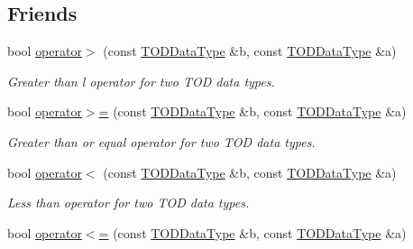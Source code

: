 \subsection*{Friends}
\begin{DoxyCompactItemize}
\item 
bool \hyperlink{structpc__emulator_1_1TODDataType_a1b6cce613b3eb660fa7df505d1dcbaa9}{operator$>$} (const \hyperlink{structpc__emulator_1_1TODDataType}{T\+O\+D\+Data\+Type} \&b, const \hyperlink{structpc__emulator_1_1TODDataType}{T\+O\+D\+Data\+Type} \&a)\hypertarget{structpc__emulator_1_1TODDataType_a1b6cce613b3eb660fa7df505d1dcbaa9}{}\label{structpc__emulator_1_1TODDataType_a1b6cce613b3eb660fa7df505d1dcbaa9}

\begin{DoxyCompactList}\small\item\em Greater than l operator for two T\+OD data types. \end{DoxyCompactList}\item 
bool \hyperlink{structpc__emulator_1_1TODDataType_a4a5ddb040ae1e265e6d7cd05db9e2096}{operator$>$=} (const \hyperlink{structpc__emulator_1_1TODDataType}{T\+O\+D\+Data\+Type} \&b, const \hyperlink{structpc__emulator_1_1TODDataType}{T\+O\+D\+Data\+Type} \&a)\hypertarget{structpc__emulator_1_1TODDataType_a4a5ddb040ae1e265e6d7cd05db9e2096}{}\label{structpc__emulator_1_1TODDataType_a4a5ddb040ae1e265e6d7cd05db9e2096}

\begin{DoxyCompactList}\small\item\em Greater than or equal operator for two T\+OD data types. \end{DoxyCompactList}\item 
bool \hyperlink{structpc__emulator_1_1TODDataType_aa4caa6e0d4573b21d3fd614bbafaf189}{operator$<$} (const \hyperlink{structpc__emulator_1_1TODDataType}{T\+O\+D\+Data\+Type} \&b, const \hyperlink{structpc__emulator_1_1TODDataType}{T\+O\+D\+Data\+Type} \&a)\hypertarget{structpc__emulator_1_1TODDataType_aa4caa6e0d4573b21d3fd614bbafaf189}{}\label{structpc__emulator_1_1TODDataType_aa4caa6e0d4573b21d3fd614bbafaf189}

\begin{DoxyCompactList}\small\item\em Less than operator for two T\+OD data types. \end{DoxyCompactList}\item 
bool \hyperlink{structpc__emulator_1_1TODDataType_a07dfd662448024ec596b6966d918d739}{operator$<$=} (const \hyperlink{structpc__emulator_1_1TODDataType}{T\+O\+D\+Data\+Type} \&b, const \hyperlink{structpc__emulator_1_1TODDataType}{T\+O\+D\+Data\+Type} \&a)\hypertarget{structpc__emulator_1_1TODDataType_a07dfd662448024ec596b6966d918d739}{}\label{structpc__emulator_1_1TODDataType_a07dfd662448024ec596b6966d918d739}


\end{DoxyCompactItemize}
